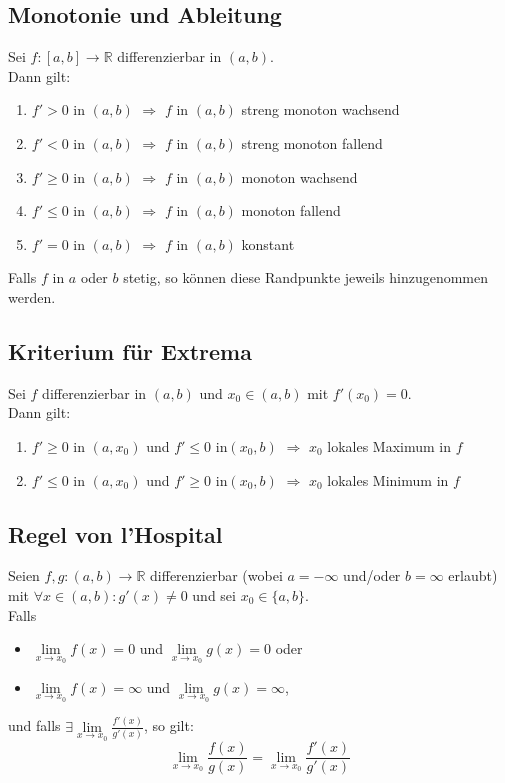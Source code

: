 \documentclass[halfparscip]{scrartcl}
\newcounter{subsection2}
\begin{document}
\subsection{Monotonie und Ableitung}
Sei $f : [a,b] \rightarrow \mathbb{R}$ differenzierbar in $(a,b)$.\\
Dann gilt:
\begin{enumerate}
	\item $f'>0$ in $(a,b)$ $\Rightarrow$ $f$ in $(a,b)$ streng monoton wachsend
	\item $f'<0$ in $(a,b)$ $\Rightarrow$ $f$ in $(a,b)$ streng monoton fallend	
	\item $f'\geq0$ in $(a,b)$ $\Rightarrow$ $f$ in $(a,b)$ monoton wachsend
	\item $f'\leq0$ in $(a,b)$ $\Rightarrow$ $f$ in $(a,b)$ monoton fallend
	\item $f' = 0$ in $(a,b)$ $\Rightarrow$ $f$ in $(a,b)$ konstant
\end{enumerate}
Falls $f$ in $a$ oder $b$ stetig, so können diese Randpunkte jeweils hinzugenommen werden.\\

\addtocounter{subsection}{2}
\subsection{Kriterium für Extrema}
Sei $f$ differenzierbar in $(a,b)$ und $x_0 \in (a,b)$ mit $f'(x_0) = 0$.\\
Dann gilt:
\begin{enumerate}
	\item $f' \geq 0$ in $(a,x_0)$ und $f'\leq 0$ in$(x_0,b)$ $\Rightarrow$ $x_0$ lokales Maximum in $f$
	\item $f' \leq 0$ in $(a,x_0)$ und $f'\geq 0$ in$(x_0,b)$ $\Rightarrow$ $x_0$ lokales Minimum in $f$
\end{enumerate}

\subsection{Regel von l'Hospital}
Seien $f,g : (a,b) \rightarrow \mathbb{R}$ differenzierbar (wobei $a = -\infty$ und/oder $b = \infty$ erlaubt) mit $\forall x \in(a,b) : g'(x) \neq 0$ und sei $x_0 \in \{a,b\}$.\\
Falls
\begin{itemize}
	\item $\lim\limits_{x \rightarrow x_0} f(x) = 0$ und $\lim\limits_{x \rightarrow x_0} g(x) = 0$ oder
	\item $\lim\limits_{x \rightarrow x_0} f(x) = \infty$ und $\lim\limits_{x \rightarrow x_0} g(x) = \infty$,
\end{itemize}
und falls $\exists \lim\limits_{x \rightarrow x_0} \frac{f'(x)}{g'(x)}$, so gilt:
\begin{equation*}
	\lim\limits_{x \rightarrow x_0} \frac{f(x)}{g(x)} = \lim\limits_{x \rightarrow x_0} \frac{f'(x)}{g'(x)}
\end{equation*}
\end{document}
